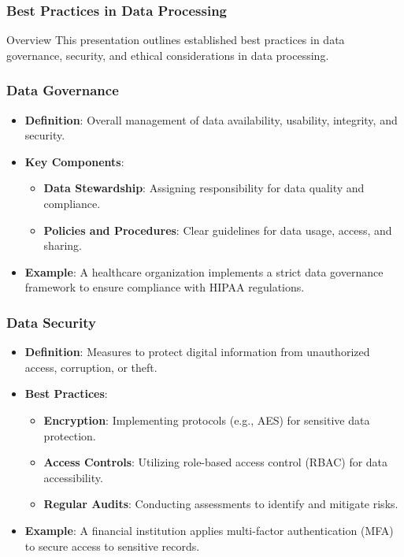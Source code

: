\documentclass{beamer}
\begin{document}
\begin{frame}[fragile]
    \frametitle{Best Practices in Data Processing}
    \begin{block}{Overview}
        This presentation outlines established best practices in data governance, security, and ethical considerations in data processing.
    \end{block}
\end{frame}

\begin{frame}[fragile]
    \frametitle{Data Governance}
    \begin{itemize}
        \item \textbf{Definition}: Overall management of data availability, usability, integrity, and security.
        \item \textbf{Key Components}:
        \begin{itemize}
            \item \textbf{Data Stewardship}: Assigning responsibility for data quality and compliance.
            \item \textbf{Policies and Procedures}: Clear guidelines for data usage, access, and sharing.
        \end{itemize}
        \item \textbf{Example}: A healthcare organization implements a strict data governance framework to ensure compliance with HIPAA regulations.
    \end{itemize}
\end{frame}

\begin{frame}[fragile]
    \frametitle{Data Security}
    \begin{itemize}
        \item \textbf{Definition}: Measures to protect digital information from unauthorized access, corruption, or theft.
        \item \textbf{Best Practices}:
        \begin{itemize}
            \item \textbf{Encryption}: Implementing protocols (e.g., AES) for sensitive data protection.
            \item \textbf{Access Controls}: Utilizing role-based access control (RBAC) for data accessibility.
            \item \textbf{Regular Audits}: Conducting assessments to identify and mitigate risks.
        \end{itemize}
        \item \textbf{Example}: A financial institution applies multi-factor authentication (MFA) to secure access to sensitive records.
    \end{itemize}
\end{frame}
\end{document}
